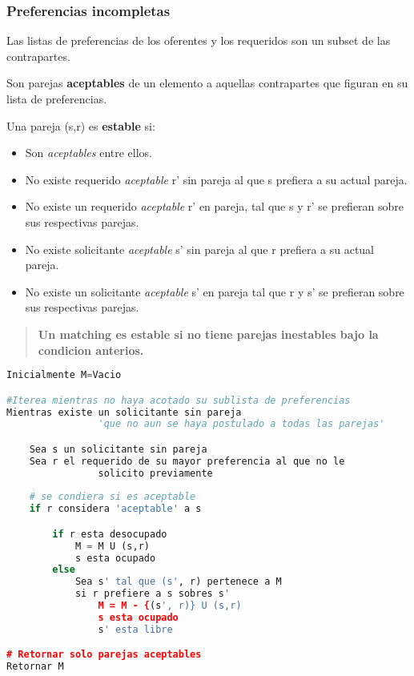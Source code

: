 \documentclass{article}
\begin{document}
\subsubsection{Preferencias incompletas}
Las listas de preferencias de los oferentes y los requeridos son un subset de las contrapartes.

Son parejas \textbf{aceptables} de un elemento a aquellas contrapartes que figuran en su lista de preferencias.

Una pareja (s,r) es \textbf{estable} si:
\begin{itemize}
    \item Son \textit{aceptables} entre ellos.
    \item No existe requerido \textit{aceptable} r' sin pareja al que s prefiera a su actual pareja.
    \item No existe un requerido \textit{aceptable} r' en pareja, tal que s y r' se prefieran sobre sus respectivas parejas.
    \item No existe solicitante \textit{aceptable} s' sin pareja al que r prefiera a su actual pareja.
    \item No existe un solicitante \textit{aceptable} s' en pareja tal que r y s' se prefieran sobre sus respectivas parejas.
\end{itemize}

\begin{quote}
    \textbf{Un matching es estable si no tiene parejas inestables bajo la condicion anterios.}
\end{quote}

\begin{lstlisting}[language=Python, caption=Algoritmo para parejas incompletas]
Inicialmente M=Vacio

#Iterea mientras no haya acotado su sublista de preferencias
Mientras existe un solicitante sin pareja
                'que no aun se haya postulado a todas las parejas' 

    Sea s un solicitante sin pareja
    Sea r el requerido de su mayor preferencia al que no le
                solicito previamente
    
    # se condiera si es aceptable
    if r considera 'aceptable' a s

        if r esta desocupado
            M = M U (s,r)
            s esta ocupado
        else
            Sea s' tal que (s', r) pertenece a M
            si r prefiere a s sobres s'
                M = M - {(s', r)} U (s,r)
                s esta ocupado
                s' esta libre

# Retornar solo parejas aceptables
Retornar M

\end{lstlisting}    
\end{document}

